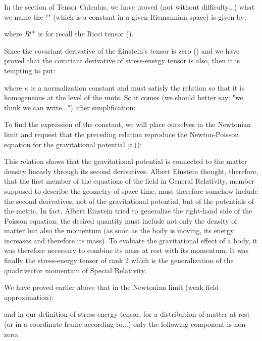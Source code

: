 	In the section of Tensor Calculus, we have proved (not without difficulty...) what we name the "" (which is a constant in a given Riemannian space) is given by:
	
	where $R^{\mu\nu}$ is for recall the Ricci tensor ().
	
	Since the covariant derivative of the Einstein's tensor is zero () and we have proved that the covariant derivative of stress-energy tensor is also, then it is tempting to put:
	
	where $\kappa$ is a normalization constant and must satisfy the relation so that it is homogeneous at the level of the units. So it comes (we should better say: "we think we can write...") after simplification:
	
	To find the expression of the constant, we will place ourselves in the Newtonian limit and request that the preceding relation reproduce the Newton-Poisson equation for the gravitational potential $\varphi$ ():
	
	\begin{tcolorbox}[title=Remark,colframe=black,arc=10pt]
	This relation shows that the gravitational potential is connected to the matter density linearly through its second derivatives. Albert Einstein thought, therefore, that the first member of the equations of the field in General Relativity, member supposed to describe the geometry of space-time, must therefore somehow include the second derivatives, not of the gravitational potential, but of the potentials of the metric. In fact, Albert Einstein tried to generalize the right-hand side of the Poisson equation: the desired quantity must include not only the density of matter but also the momentum (as soon as the body is moving, its energy increases and therefore its mass). To evaluate the gravitational effect of a body, it was therefore necessary to combine its mass at rest with its momentum. It was finally the stress-energy tensor of rank $2$ which is the generalization of the quadrivector momentum of Special Relativity.
	\end{tcolorbox}
	We have proved earlier above that in the Newtonian limit (weak field approximation):
	
	and in our definition of stress-energy tensor, for a distribution of matter at rest (or in a coordinate frame according to...) only the following component is non-zero:
	
